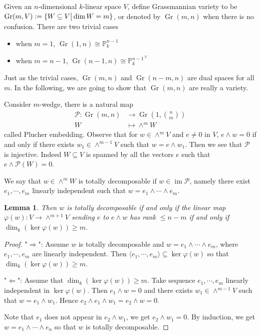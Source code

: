 \documentclass{ctexart}
\newtheorem{lemma}{Lemma}[section]
\newcommand{\im}{\operatorname{im}}
\newcommand{\grassmannianscheme}[2]{\operatorname{Gr}(#1, #2)}
\begin{document}
Given an $n$-dimensional $k$-linear space $V$, define Grassmannian variety to be $\grassmannianscheme{m}{V} := \{W \subseteq V \big{|} \dim W = m\}$,
or denoted by $\grassmannianscheme{m}{n}$ when there is no confusion.
There are two trivial cases
\begin{itemize}
    \item when $m = 1$, $\grassmannianscheme{1}{n} \cong \mathbb{P}_{k}^{n - 1}$
    \item when $m = n - 1$, $\grassmannianscheme{n - 1}{n} \cong {\mathbb{P}_{k}^{n - 1}}^{\vee}$
\end{itemize}
Just as the trivial cases, $\grassmannianscheme{m}{n}$ and $\grassmannianscheme{n - m}{n}$ are dual spaces for all $m$.
In the following, we are going to show that $\grassmannianscheme{m}{n}$ are really a variety.
\par
Consider $m$-wedge, there is a natural map
\begin{equation}
    \begin{split}
        \mathcal{P}: \grassmannianscheme{m}{n} & \longrightarrow \grassmannianscheme{1}{\binom{n}{m}} \\
        W & \longmapsto \wedge^{m}W
    \end{split}
\end{equation}
called Plucher embedding.
Observe that for $w\in \wedge^{m}V$ and $e \neq 0$ in $V$, $e \wedge w = 0$ if and only if there exists $w_{1}\in \wedge^{m - 1}V$ such that $w = e \wedge w_{1}$.
Then we see that $\mathcal{P}$ is injective.
Indeed $W \subseteq V$ is spanned by all the vectors $e$ such that $e \wedge \mathcal{P}(W) = 0$.
\par
We say that $w\in \wedge^{m}W$ is totally decomposable if $w\in \im \mathcal{P}$, 
namely there exist $e_{1}, \cdots, e_{m}$ linearly independent such that $w = e_{1} \wedge \cdots \wedge e_{m}$.
\begin{lemma}
    Then $w$ is totally decomposable if and only if the linear map $\varphi(w): V \rightarrow \wedge^{m + 1}V$ sending $e$ to $e \wedge w$ has rank $\le n - m$ if and only if $\dim_{k} (\ker \varphi(w)) \ge m$.
    \label{Lemma 6.1}
\end{lemma}
\begin{proof}
    "$\Rightarrow$": Assume $w$ is totally decomposable and $w = e_{1} \wedge \cdots \wedge e_{m}$, where $e_{1}, \cdots, e_{m}$ are linearly independent.
    Then $\langle e_{1}, \cdots, e_{m} \rangle \subseteq \ker \varphi(w)$ so that $\dim_{k} (\ker \varphi(w)) \ge m$.
    \par
    "$\Leftarrow$": Assume that $\dim_{k} (\ker \varphi(w)) \ge m$.
    Take sequence $e_{1}, \cdots, e_{m}$ linearly independent in $\ker \varphi(w)$.
    Then $e_{1} \wedge w = 0$ and there exists $w_{1}\in \wedge^{m - 1}V$ such that $w = e_{1} \wedge w_{1}$.
    Hence $e_{2} \wedge e_{1} \wedge w_{1} = e_{2} \wedge w = 0$.
    \par
    Note that $e_{1}$ does not appear in $e_{2} \wedge w_{1}$, we get $e_{2} \wedge w_{1} = 0$.
    By induction, we get $w = e_{1} \wedge \cdots \wedge e_{n}$ so that $w$ is totally decomposable.
\end{proof}
\end{document}

